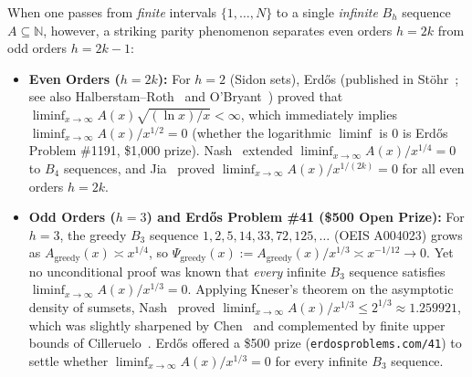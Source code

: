 \documentclass[11pt,a4paper]{article}
\theoremstyle{remark}
\begin{document}
When one passes from \emph{finite} intervals $\{1, \dots, N\}$ to a single \emph{infinite} $B_h$ sequence $A \subseteq \mathbb{N}$, however, a striking parity phenomenon separates even orders $h = 2k$ from odd orders $h = 2k - 1$:
\begin{itemize}
  \item \textbf{Even Orders ($h = 2k$):} For $h = 2$ (Sidon sets), Erd\H{o}s (published in St\"ohr~\cite{Stohr1955}; see also Halberstam--Roth~\cite{HalberstamRoth1966} and O'Bryant~\cite{OBryant2004}) proved that $\liminf_{x\to\infty} A(x)\sqrt{(\ln x)/x} < \infty$, which immediately implies $\liminf_{x\to\infty} A(x)/x^{1/2} = 0$ (whether the logarithmic $\liminf$ is $0$ is Erd\H{o}s Problem \#1191, \$1,000 prize). Nash~\cite{Nash1989} extended $\liminf_{x\to\infty} A(x)/x^{1/4} = 0$ to $B_4$ sequences, and Jia~\cite{Jia1993} proved $\liminf_{x\to\infty} A(x)/x^{1/(2k)} = 0$ for all even orders $h = 2k$.
  \item \textbf{Odd Orders ($h = 3$) and Erd\H{o}s Problem \#41 (\$500 Open Prize):} For $h = 3$, the greedy $B_3$ sequence $1, 2, 5, 14, 33, 72, 125, \dots$ (OEIS A004023) grows as $A_{\mathrm{greedy}}(x) \asymp x^{1/4}$, so $\Psi_{\mathrm{greedy}}(x) := A_{\mathrm{greedy}}(x)/x^{1/3} \asymp x^{-1/12} \to 0$. Yet no unconditional proof was known that \emph{every} infinite $B_3$ sequence satisfies $\liminf_{x\to\infty} A(x)/x^{1/3} = 0$. Applying Kneser's theorem on the asymptotic density of sumsets, Nash~\cite{Nash1995} proved $\liminf_{x\to\infty} A(x)/x^{1/3} \le 2^{1/3} \approx 1.259921$, which was slightly sharpened by Chen~\cite{Chen1996} and complemented by finite upper bounds of Cilleruelo~\cite{Cilleruelo2001}. Erd\H{o}s offered a \$500 prize (\texttt{erdosproblems.com/41}) to settle whether $\liminf_{x\to\infty} A(x)/x^{1/3} = 0$ for every infinite $B_3$ sequence.
\end{itemize}
\end{document}

